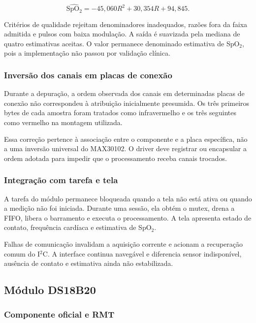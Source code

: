 \documentclass[a4paper,12pt]{article}
\begin{document}
\[
\widehat{\mathrm{SpO_2}}=-45{,}060R^2+30{,}354R+94{,}845.
\]


Crit\'erios de qualidade rejeitam denominadores inadequados, raz\~oes fora da faixa admitida e pulsos com baixa modula\c{c}\~ao. A sa\'ida \'e suavizada pela mediana de quatro estimativas aceitas. O valor permanece denominado estimativa de SpO$_2$, pois a implementa\c{c}\~ao n\~ao passou por valida\c{c}\~ao cl\'inica.


\subsubsection{Invers\~ao dos canais em placas de conex\~ao}


Durante a depura\c{c}\~ao, a ordem observada dos canais em determinadas placas de conex\~ao n\~ao correspondeu \`a atribui\c{c}\~ao inicialmente presumida. Os tr\^es primeiros bytes de cada amostra foram tratados como infravermelho e os tr\^es seguintes como vermelho na montagem utilizada.


Essa corre\c{c}\~ao pertence \`a associa\c{c}\~ao entre o componente e a placa espec\'ifica, n\~ao a uma invers\~ao universal do MAX30102. O driver deve registrar ou encapsular a ordem adotada para impedir que o processamento receba canais trocados.


\subsubsection{Integra\c{c}\~ao com tarefa e tela}


A tarefa do m\'odulo permanece bloqueada quando a tela n\~ao est\'a ativa ou quando a medi\c{c}\~ao n\~ao foi iniciada. Durante uma sess\~ao, ela obt\'em o mutex, drena a FIFO, libera o barramento e executa o processamento. A tela apresenta estado de contato, frequ\^encia card\'iaca e estimativa de SpO$_2$.


Falhas de comunica\c{c}\~ao invalidam a aquisi\c{c}\~ao corrente e acionam a recupera\c{c}\~ao comum do I$^2$C. A interface continua naveg\'avel e diferencia sensor indispon\'ivel, aus\^encia de contato e estimativa ainda n\~ao estabilizada.


\subsection{M\'odulo DS18B20}


\subsubsection{Componente oficial e RMT}
\end{document}
